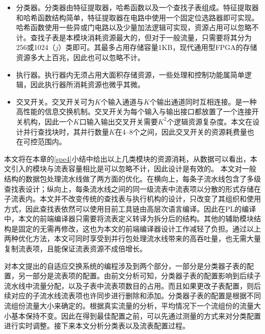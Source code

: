 \begin{itemize}
	\item 分类器。分类器由特征提取器，哈希函数以及一个查找子表组成。特征提取器和哈希函数结构简单，特征提取器在电路中使用一个固定位选路器即可实现。哈希函数使用一些异或门电路以及少量加法逻辑可实现，资源占用可以忽略不计。查找子表是本模块消耗资源最大的，但对于一般流量，只需要将其分为256或1024（$j$）类即可。其最多占用存储容量1KB，现代通用型FPGA的存储资源多大上百兆，因此也可以忽略不计。
	\item 执行器。执行器内无须占用大面积存储资源，一些处理和控制功能属简单逻辑，因此执行器所消耗资源也微乎其微。
	\item 交叉开关。交叉开关可为$ K $个输入通道与$ K $个输出通道同时互相连接。是一种高性能的信息交换机制。交叉开关为每个输入与输出接口都放置了一个连接开关机构，因此一个$ K $口输入输出交叉开关需要$K^2$个逻辑资源复杂度。本文在设计并行查找块时，其并行数量$ K $在4--8个之间，因此交叉开关的资源耗费量也在可控范围内。
\end{itemize}

本文将在本章的\ref{spe4}小结中给出以上几类模块的资源消耗，从数据可以看出，本文引入的模块与流表容量相比是可以忽略不计，因此设计是有效的。
本文对一般结构的数据包处理流水线做了两方面的优化。在横向上，每条子流水线包含了多级查找表设计；纵向上，每条流水线之间的同一级流表中流表项以分散的形式存储在子流表内。本文并不改变传统的查找表与执行机构的设计，只改变了其组织和使用方式，因此查找表依然可以使用目前工具链由高层次语言编译。因此在PL的编译中，本文的前端编译器只需要将流表定义转译为拆分后的结构。其他的辅助模块结构是固定的无需再修改，这也为本文的前端编译器设计工作减轻了负担。通过以上两种优化方法，本文可同时享受到并行包处理流水线带来的高吞吐量，也无需大量复制流表项，且能保证流表资源不成倍增长。


%

\label{chap45}

\label{chap4ProblemAnalysis}

对本文提出的自适应交换系统的编程涉及到两个部分，一部分是分类器子表的配置，另一部分是流表项的配置。由前文分析可知，分类器子表的配置影响到后续子流水线中流量分配，以及子表中流表项数目的占用。而且如果更改子表配置，则后续对应的子流水线流表项也许同步进行删除和添加。分类器子表的配置是根据不同流组份流量大小来确定的。根据真实流量的分析，平均情况下一个流组份的流量大小基本保持不变。因此在得到最佳配置之前，可以先通过测量的方式来对分类配置进行实时调整。接下来本文分析分类表以及流表配置过程。

